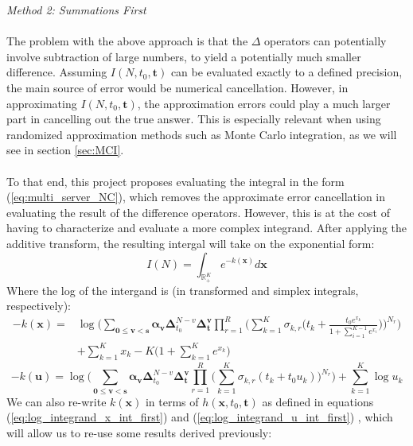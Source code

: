 \textit{\large{Method 2: Summations First}}
\\\\
The problem with the above approach is that the \(\Delta\) operators can potentially involve subtraction of large numbers, to yield a potentially much smaller difference. Assuming \(I(N, t_0, \mathbf{t})\) can be evaluated exactly to a defined precision, the main source of error would be numerical cancellation. However, in approximating \(I(N, t_0, \mathbf{t})\), the approximation errors could play a much larger part in cancelling out the true answer. This is especially relevant when using randomized approximation methods such as Monte Carlo integration, as we will see in section \ref{sec:MCI}.
\\\\
To that end, this project proposes evaluating the integral in the form (\ref{eq:multi_server_NC}), which removes the approximate error cancellation in evaluating the result of the difference operators. However, this is at the cost of having to characterize and evaluate a more complex integrand. After applying the additive transform, the resulting intergal will take on the exponential form:
\begin{equation}\label{eq:integral_form_multi_server_2}
    I(N) = \int_{\mathbb{R}^K_+} e^{-k(\mathbf{x})} d \mathbf{x}
\end{equation}
Where the log of the intergand is (in transformed and simplex integrals, respectively):
\begin{equation}\label{eq:log_integrand_multi_server_2}
\begin{split}
    -k(\mathbf{x}) = &  \log \bigg( \sum_{\mathbf{0 \leq v <s}} \mathbf{\alpha_v} \boldsymbol{\Delta}_{t_0}^{N-v} \boldsymbol{\Delta}_{\mathbf{t}}^{\mathbf{v}} \prod_{r=1}^R  \bigg(\sum_{k=1}^K \sigma_{k,r} \bigg(t_k + \frac{t_0 e^{x_k}}{ 1 + \sum_{i=1}^{K-1} e^{x_i}} \bigg) \bigg)^{N_r} \bigg)\\ 
    & + \sum_{k=1}^K x_k - K \bigg( 1+ \sum_{k=1}^K e^{x_k} \bigg)
\end{split}
\end{equation}
\begin{equation}
    - k(\mathbf{u}) = \log \bigg( \sum_{\mathbf{0 \leq v <s}} \mathbf{\alpha_v} \boldsymbol{\Delta}_{t_0}^{N-v} \boldsymbol{\Delta}_{\mathbf{t}}^{\mathbf{v}} \prod_{r=1}^R  \bigg(\sum_{k=1}^K \sigma_{k,r}(t_k + t_0 u_k) \bigg)^{N_r}\bigg) +  \sum_{k=1}^K \log u_k
\end{equation}
We can also re-write \(k(\mathbf{x})\) in terms of \(h(\mathbf{x}, t_0, \mathbf{t})\) as defined in equations (\ref{eq:log_integrand_x_int_first}) and (\ref{eq:log_integrand_u_int_first}) , which will allow us to re-use some results derived previously:

